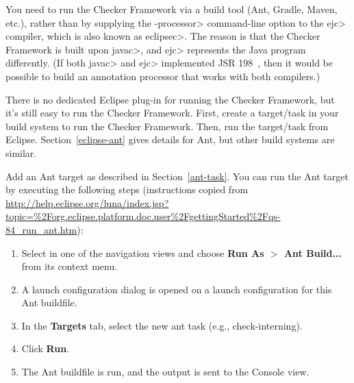 

You
need to run the Checker Framework via a build tool (Ant, Gradle, Maven, etc.), rather
than by supplying the \<-processor> command-line option to the \<ejc>
compiler, which is also known as \<eclipsec>.
The reason is that the Checker Framework is built upon \<javac>,
and \<ejc> represents the Java program differently.  (If both \<javac> and \<ejc>
implemented JSR 198~\cite{JSR198}, then it would be possible to build
an annotation processor that works with both compilers.)


There is no dedicated Eclipse plug-in for running the Checker Framework,
but it's still easy to run the Checker Framework.  First, create a
target/task in your build system to run the Checker Framework.  Then, run
the target/task from Eclipse.  Section~\ref{eclipse-ant} gives details for
Ant, but other build systems are similar.



Add an Ant target as described in Section~\ref{ant-task}.  You can
run the Ant target by executing the following steps
(instructions copied from
{\codesize\url{http://help.eclipse.org/luna/index.jsp?topic=%2Forg.eclipse.platform.doc.user%2FgettingStarted%2Fqs-84_run_ant.htm}}):

\begin{enumerate}

\item
  Select  in one of the navigation views and choose
  {\bf Run As $>$ Ant Build...} from its context menu.

\item
  A launch configuration dialog is opened on a launch configuration
  for this Ant buildfile.

\item
  In the {\bf Targets} tab, select the new ant task (e.g., check-interning).

\item
  Click {\bf Run}.

\item
  The Ant buildfile is run, and the output is sent to the Console view.

\end{enumerate}


